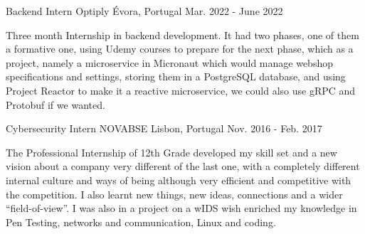 


\begin{cventries}


  \cventry
  {Backend Intern} %
  {Optiply} %
  {Évora, Portugal} %
  {Mar. 2022 - June 2022} %
  { %
    \begin{cvitems}
      \item Three month Internship in backend development. It had two phases, one of them a formative one, using Udemy courses to prepare for the next phase, which as a project, namely a microservice in Micronaut which would manage webshop specifications and settings, storing them in a PostgreSQL database, and using Project Reactor to make it a reactive microservice, we could also use gRPC and Protobuf if we wanted.
    \end{cvitems}
  }


  \cventry
  {Cybersecurity Intern} %
  {NOVABSE} %
  {Lisbon, Portugal} %
  {Nov. 2016 - Feb. 2017} %
  { %
    \begin{cvitems}
      \item The Professional Internship of 12th Grade developed my skill set and a new vision about a company very different of the last one, with a completely different internal culture and ways of being although very efficient and competitive with the competition. I also learnt new things, new ideas, connections and a wider ``field-of-view''. I was also in a project on a wIDS wish enriched my knowledge in Pen Testing, networks and communication, Linux and coding.
    \end{cvitems}
  }



\end{cventries}
